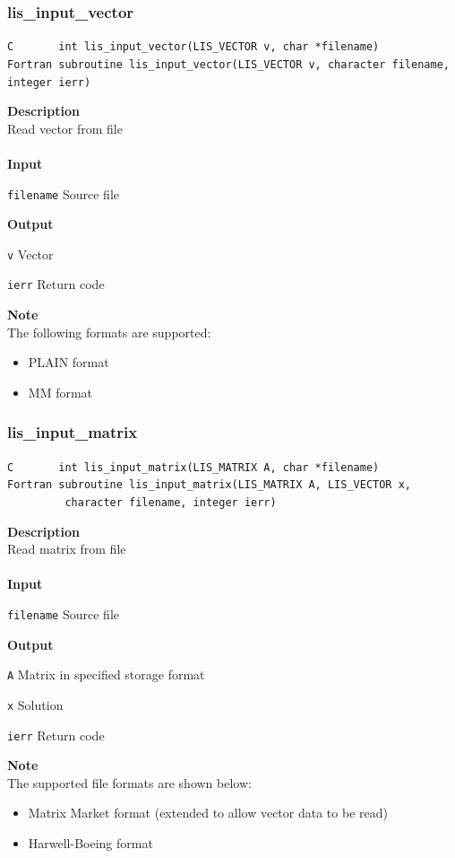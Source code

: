 \documentclass[a4paper]{article}
\newcommand{\namelistlabel}[1]{\mbox{#1}\hfill}
\newenvironment{namelist}[1]{%
 \begin{list}{}
  {\let\makelabel\namelistlabel
  \settowidth{\labelwidth}{#1}
  \setlength{\leftmargin}{1.1\labelwidth}}
}{%
\end{list}}
\begin{document}
  \subsubsection{lis\_input\_vector}
\begin{screen}
\verb|C       int lis_input_vector(LIS_VECTOR v, char *filename)|\\
\verb|Fortran subroutine lis_input_vector(LIS_VECTOR v, character filename, integer ierr) |
\end{screen}
{\bf Description}\\
\indent
Read vector from file
\\ \\
\noindent
{\bf Input}
\begin{namelist}{XXXXXXXXXXXXXXXXXXXX}
\item[\tt filename] Source file
\end{namelist}
{\bf Output}
\begin{namelist}{XXXXXXXXXXXXXXXXXXXX}
\item[\tt v] Vector
\item[\tt ierr] Return code
\end{namelist}
{\bf Note}\\
\indent
The following formats are supported:
\begin{itemize}
\item PLAIN format
\item MM format
\end{itemize}

  \subsubsection{lis\_input\_matrix}
\begin{screen}
\verb|C       int lis_input_matrix(LIS_MATRIX A, char *filename)|\\
\verb|Fortran subroutine lis_input_matrix(LIS_MATRIX A, LIS_VECTOR x,|\\
\verb|         character filename, integer ierr)|
\end{screen}
{\bf Description}\\
\indent
Read matrix from file
\\ \\
\noindent
{\bf Input}
\begin{namelist}{XXXXXXXXXXXXXXXXXXXX}
\item[\tt filename] Source file
\end{namelist}
{\bf Output}
\begin{namelist}{XXXXXXXXXXXXXXXXXXXX}
\item[\tt A] Matrix in specified storage format
\item[\tt x] Solution
\item[\tt ierr] Return code
\end{namelist}
{\bf Note}\\
\indent
The supported file formats are shown below:
\begin{itemize}
\item Matrix Market format (extended to allow vector data to be read)
\item Harwell-Boeing format
\end{itemize}
\end{document}
